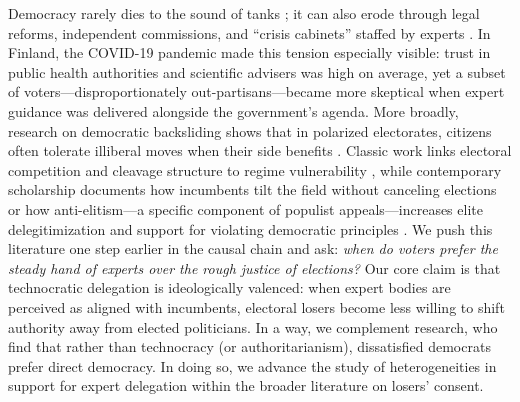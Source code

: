 \documentclass[11pt]{article}\usepackage[]{graphicx}\usepackage[]{xcolor}
\begin{document}
Democracy rarely dies to the sound of tanks \parencite{Levitsky:2018aa}; it can also erode through legal reforms, independent commissions, and ``crisis cabinets'' staffed by experts \parencite{Levitsky2002}. In Finland, the COVID-19 pandemic made this tension especially visible: trust in public health authorities and scientific advisers was high on average, yet a subset of voters---disproportionately out-partisans---became more skeptical when expert guidance was delivered alongside the government's agenda. More broadly, research on democratic backsliding shows that in polarized electorates, citizens often tolerate illiberal moves when their side benefits \parencite{Svolik2020, Svolik2019}. Classic work links electoral competition and cleavage structure to regime vulnerability \parencite{Sartori1976, Dahl1971, Lipset1981}, while contemporary scholarship documents how incumbents tilt the field without canceling elections \parencite{Levitsky2010, Bermeo2016, Waldner2018} or how anti-elitism---a specific component of populist appeals---increases elite delegitimization and support for violating democratic principles \parencite{Lendway2025}. We push this literature one step earlier in the causal chain and ask: \emph{when do voters prefer the steady hand of experts over the rough justice of elections?} Our core claim is that technocratic delegation is ideologically valenced: when expert bodies are perceived as aligned with incumbents, electoral losers become less willing to shift authority away from elected politicians. In a way, we complement \textcite{VanderMeer2025} research, who find that rather than technocracy (or authoritarianism), dissatisfied democrats prefer direct democracy. In doing so, we advance the study of heterogeneities in support for expert delegation within the broader literature on losers' consent. 
\end{document}

